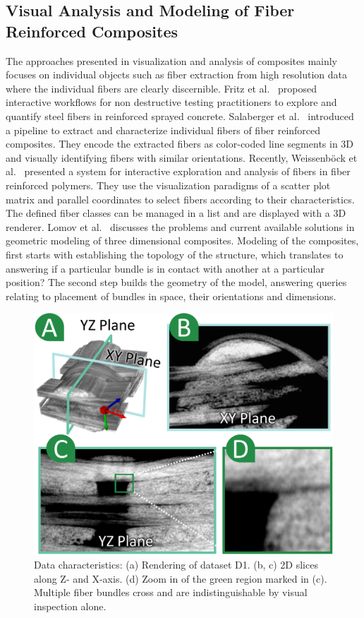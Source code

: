 \subsection {Visual Analysis and Modeling of Fiber Reinforced Composites}
The approaches presented in visualization and analysis of composites mainly focuses on individual objects such as fiber extraction from high resolution data where the individual fibers are clearly discernible. Fritz et al.~\cite{Fritz2009} proposed interactive workflows for non destructive testing practitioners to explore and quantify steel fibers in reinforced sprayed concrete. %
Salaberger et al.~\cite{Salaberger2011} introduced a pipeline to extract and characterize individual fibers of fiber reinforced composites. They encode the extracted fibers as color-coded line segments in 3D and visually identifying fibers with similar orientations.
Recently, Weissenb{\"o}ck et al.~\cite{Weissenbock2014} presented a system for interactive exploration and analysis of fibers in fiber reinforced polymers.
They use the visualization paradigms of a scatter plot matrix and parallel coordinates to select fibers according to their characteristics. The defined fiber classes can be managed in a list and are displayed with a 3D renderer.  
Lomov et al.~\cite{Lomov2010} discusses the problems and current available solutions in geometric modeling of three dimensional composites.
Modeling of the composites, first starts with establishing the topology of the structure, which translates to answering if a particular bundle is in contact with another at a particular position? The second step builds the geometry of the model, answering queries relating to placement of bundles in space, their orientations and dimensions. 
\begin{figure}[htb]
\centering
\includegraphics[width=\linewidth]{images/data-char2row.eps}
\caption
{
Data characteristics: (a) Rendering of dataset D1. (b, c) 2D slices along Z- and X-axis. (d) Zoom in of the green region marked in (c). Multiple fiber bundles cross and are indistinguishable by visual inspection alone. 
}
\label{fig:data-char}
\end{figure}


